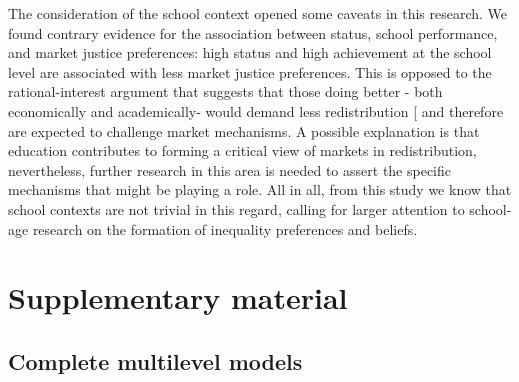 \documentclass[
  12pt,
  letterpaper,
]{article}
\begin{document}
The consideration of the school context opened some caveats in this
research. We found contrary evidence for the association between status,
school performance, and market justice preferences: high status and high
achievement at the school level are associated with less market justice
preferences. This is opposed to the rational-interest argument that
suggests that those doing better - both economically and academically-
would demand less redistribution
{[}\citeproc{ref-bullock_education_2021}{80}{]} and therefore are
expected to challenge market mechanisms. A possible explanation is that
education contributes to forming a critical view of markets in
redistribution, nevertheless, further research in this area is needed to
assert the specific mechanisms that might be playing a role. All in all,
from this study we know that school contexts are not trivial in this
regard, calling for larger attention to school-age research on the
formation of inequality preferences and beliefs.

\newpage{}

\section{Supplementary material}\label{supplementary-material}

\subsection{Complete multilevel
models}\label{complete-multilevel-models}
\end{document}
